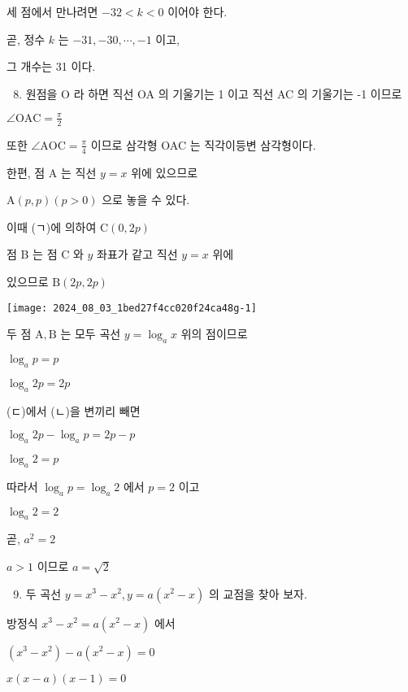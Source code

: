 \documentclass[10pt]{article}
\begin{document}
세 점에서 만나려면 \(-32<k<0\) 이어야 한다.

곧, 정수 \(k\) 는 \(-31,-30, \cdots,-1\) 이고,

그 개수는 31 이다.

\begin{enumerate}
  \setcounter{enumi}{7}
  \item 원점을 O 라 하면 직선 OA 의 기울기는 1 이고 직선 AC 의 기울기는 -1 이므로
\end{enumerate}

\(\angle \mathrm{OAC}=\frac{\pi}{2}\)

또한 \(\angle \mathrm{AOC}=\frac{\pi}{4}\) 이므로 삼각형 OAC 는 직각이등변 삼각형이다.

한편, 점 A 는 직선 \(y=x\) 위에 있으므로

\(\mathrm{A}(p, p)(p>0)\) 으로 놓을 수 있다.

이때 (ㄱ)에 의하여 \(\mathrm{C}(0,2 p)\)

점 B 는 점 C 와 \(y\) 좌표가 같고 직선 \(y=x\) 위에

있으므로 \(\mathrm{B}(2 p, 2 p)\)

\begin{center}
\texttt{[image: 2024\_08\_03\_1bed27f4cc020f24ca48g-1]}
\end{center}

두 점 \(\mathrm{A}, \mathrm{B}\) 는 모두 곡선 \(y=\log _{a} x\) 위의 점이므로

\(\log _{a} p=p\)

\(\log _{a} 2 p=2 p\)

(ㄷ)에서 (ㄴ)을 변끼리 빼면

\(\log _{a} 2 p-\log _{a} p=2 p-p\)

\(\log _{a} 2=p\)

따라서 \(\log _{a} p=\log _{a} 2\) 에서 \(p=2\) 이고

\(\log _{a} 2=2\)

곧, \(a^{2}=2\)

\(a>1\) 이므로 \(a=\sqrt{2}\)

\begin{enumerate}
  \setcounter{enumi}{8}
  \item 두 곡선 \(y=x^{3}-x^{2}, y=a\left(x^{2}-x\right)\) 의 교점을 찾아 보자.
\end{enumerate}

방정식 \(x^{3}-x^{2}=a\left(x^{2}-x\right)\) 에서

\(\left(x^{3}-x^{2}\right)-a\left(x^{2}-x\right)=0\)

\(x(x-a)(x-1)=0\)
\end{document}
